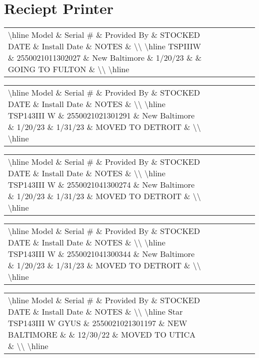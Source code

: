 \documentclass{article}%
\begin{document}
\section{Reciept Printer}%
\label{sec:RecieptPrinter}%
\begin{tabularx}{\textwidth}{|X|X|X|X|X|X|X|}%
\textbackslash{}hline%
Model \& Serial \# \& Provided By \& STOCKED DATE \& Install Date \& NOTES \&  \textbackslash{}\textbackslash{}%
\textbackslash{}hline%
TSPIIIW \& 2550021011302027 \& New Baltimore \& 1/20/23 \&  \& GOING TO FULTON \&  \textbackslash{}\textbackslash{}%
\textbackslash{}hline%
\end{tabularx}%
\begin{tabularx}{\textwidth}{|X|X|X|X|X|X|X|}%
\textbackslash{}hline%
Model \& Serial \# \& Provided By \& STOCKED DATE \& Install Date \& NOTES \&  \textbackslash{}\textbackslash{}%
\textbackslash{}hline%
TSP143III W \& 2550021021301291 \& New Baltimore \& 1/20/23 \& 1/31/23 \& MOVED TO DETROIT \&  \textbackslash{}\textbackslash{}%
\textbackslash{}hline%
\end{tabularx}%
\begin{tabularx}{\textwidth}{|X|X|X|X|X|X|X|}%
\textbackslash{}hline%
Model \& Serial \# \& Provided By \& STOCKED DATE \& Install Date \& NOTES \&  \textbackslash{}\textbackslash{}%
\textbackslash{}hline%
TSP143III W \& 2550021041300274 \& New Baltimore \& 1/20/23 \& 1/31/23 \& MOVED TO DETROIT \&  \textbackslash{}\textbackslash{}%
\textbackslash{}hline%
\end{tabularx}%
\begin{tabularx}{\textwidth}{|X|X|X|X|X|X|X|}%
\textbackslash{}hline%
Model \& Serial \# \& Provided By \& STOCKED DATE \& Install Date \& NOTES \&  \textbackslash{}\textbackslash{}%
\textbackslash{}hline%
TSP143III W \& 2550021041300344 \& New Baltimore \& 1/20/23 \& 1/31/23 \& MOVED TO DETROIT \&  \textbackslash{}\textbackslash{}%
\textbackslash{}hline%
\end{tabularx}%
\begin{tabularx}{\textwidth}{|X|X|X|X|X|X|X|}%
\textbackslash{}hline%
Model \& Serial \# \& Provided By \& STOCKED DATE \& Install Date \& NOTES \&  \textbackslash{}\textbackslash{}%
\textbackslash{}hline%
Star TSP143III W GYUS \& 2550021021301197 \& NEW BALTIMORE \&  \& 12/30/22 \& MOVED TO UTICA \&  \textbackslash{}\textbackslash{}%
\textbackslash{}hline%
\end{tabularx}

%
\end{document}
